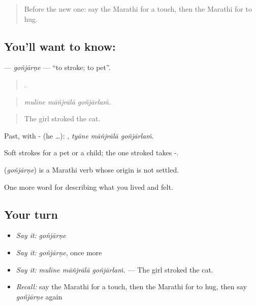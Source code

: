 \label{lesson:MR-C501-gonjarne}



\begin{quote}
Before the new one: say the Marathi for a touch, then the Marathi for to hug.
\end{quote}

\subsection*{You'll want to know: }
\textbf{} — \emph{goñjārṇe} — \textquotedblleft{}to stroke; to pet\textquotedblright{}.

\begin{quote}
  .
\end{quote}

\begin{quote}
\emph{mulīne māñjrālā goñjārlaṁ.}
\end{quote}

\begin{quote}
The girl stroked the cat.
\end{quote}

Past, with - (he …):   , \emph{tyāne māñjrālā goñjārlaṁ}.

Soft strokes for a pet or a child; the one stroked takes -.

\begin{cousinweb}
\textbf{} (\emph{goñjārṇe}) is a Marathi verb whose origin is not settled.
\end{cousinweb}

\begin{grammarlens}[title={What you've built}]
One more word for describing what you lived and felt.
\end{grammarlens}

\subsection*{Your turn}
\begin{itemize}
\raggedright
  \item \emph{Say it:} \emph{goñjārṇe}
  \item \emph{Say it:} \emph{goñjārṇe}, once more
  \item \emph{Say it:} \emph{mulīne māñjrālā goñjārlaṁ.} — The girl stroked the cat.
  \item \emph{Recall:} say the Marathi for a touch, then the Marathi for to hug, then say \emph{goñjārṇe} again
\end{itemize}

